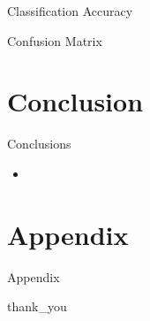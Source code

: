 \begin{frame}{Classification Accuracy}

\end{frame}

\begin{frame}{Confusion Matrix}

\end{frame}

\section{Conclusion}

\begin{frame}{Conclusions}
    \begin{itemize}
        \item
    \end{itemize}
\end{frame}

\section{Appendix}

\begin{frame}{Appendix}

\end{frame}

{
{thank_you}
\begin{frame}[plain]
\end{frame}
}

